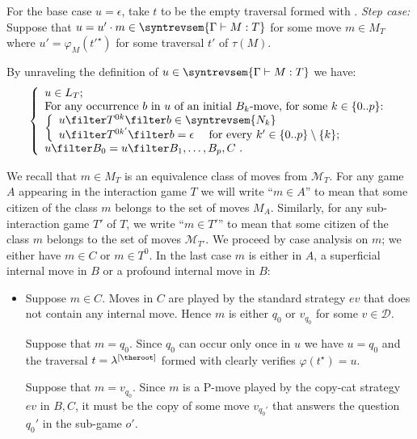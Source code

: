 \begin{itemize}[$\bullet$]
\begin{enumerate}
    For the base case $u=\epsilon$, take $t$ to be the empty traversal formed with .
    \emph{Step case:} Suppose that $u = u' \cdot m \in
    \syntrevsem{\Gamma \vdash M : T}$ for some move $m \in
    M_T$ where $u' = \varphi_M(t'^\star)$ for some traversal
    $t'$ of $\tau(M)$.

    By unraveling the definition of $u \in \syntrevsem{\Gamma \vdash M : T}$ we have:
    \begin{equation}
    \left\{
    \begin{array}{ll}
        u \in L_T ;  \\
        \hbox{For any occurrence $b$ in $u$ of an initial $B_k$-move, for some $k \in \{0..p\}$:} \\
        \left\{\begin{array}{ll}
            u \filter T^{0k} \filter b  \in \syntrevsem{N_k} \\
            u \filter T^{0k'} \filter b  = \epsilon \quad \mbox{ for every } k'\in \{0..p\}\setminus\{k\};
        \end{array}
        \right. \\
        u \filter B_0 = u \filter B_1, \ldots, B_p, C \ .
    \end{array}
    \right.
      \label{eqn:u_in_app_intersem}
    \end{equation}

We recall that $m \in M_T$ is an equivalence class of moves
from $\mathcal{M}_T$. For any game $A$ appearing in the
interaction game $T$ we will write ``$m \in A$'' to mean
that some citizen of the class $m$ belongs to the set of
moves $M_A$. Similarly, for any sub-interaction game $T'$ of
$T$, we write ``$m \in T'$'' to mean that some citizen of
the class $m$ belongs to the set of moves
$\mathcal{M}_{T'}$. We proceed by case analysis on $m$; we either have $m\in C$ or $m\in T^0$. In the last case $m$ is either in $A$, a superficial internal move in $B$ or a profound internal move in $B$:
    \begin{itemize}
    \item Suppose $m \in C$. Moves in $C$ are played by the standard strategy $ev$ that does not contain any internal move. Hence $m$ is either $q_0$ or $v_{q_0}$ for some $v\in\mathcal{D}$.

    Suppose that $m=q_0$. Since $q_0$ can occur only once in
    $u$ we have $u=q_0$ and the traversal $t=\lambda^{[\theroot]}$ formed with  clearly verifies $\varphi(t^\star) = u$.

    Suppose that $m=v_{q_0}$. Since $m$ is a P-move played by the
    copy-cat strategy $ev$ in $B,C$, it must be the copy of some move $v_{q_0'}$ that answers the question $q_0'$ in the sub-game $o'$.


\end{itemize}
\end{enumerate}
\end{itemize}
